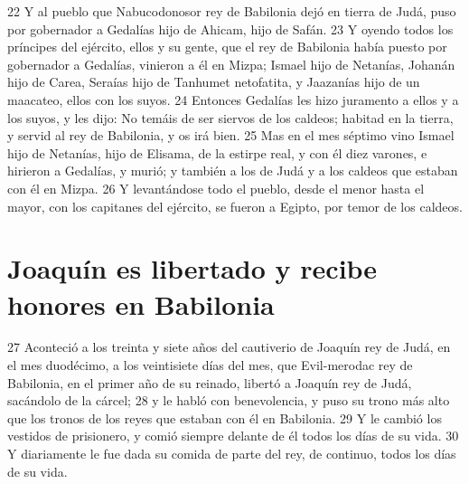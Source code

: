 22 Y al pueblo que Nabucodonosor rey de Babilonia dejó en tierra de Judá, puso por gobernador a Gedalías hijo de Ahicam, hijo de Safán.
23 Y oyendo todos los príncipes del ejército, ellos y su gente, que el rey de Babilonia había puesto por gobernador a Gedalías, vinieron a él en Mizpa; Ismael hijo de Netanías, Johanán hijo de Carea, Seraías hijo de Tanhumet netofatita, y Jaazanías hijo de un maacateo, ellos con los suyos.
24 Entonces Gedalías les hizo juramento a ellos y a los suyos, y les dijo: No temáis de ser siervos de los caldeos; habitad en la tierra, y servid al rey de Babilonia, y os irá bien. 
25 Mas en el mes séptimo vino Ismael hijo de Netanías, hijo de Elisama, de la estirpe real, y con él diez varones, e hirieron a Gedalías, y murió; y también a los de Judá y a los caldeos que estaban con él en Mizpa. 
26 Y levantándose todo el pueblo, desde el menor hasta el mayor, con los capitanes del ejército, se fueron a Egipto, por temor de los caldeos. 

\section*{Joaquín es libertado y recibe honores en Babilonia}

27 Aconteció a los treinta y siete años del cautiverio de Joaquín rey de Judá, en el mes duodécimo, a los veintisiete días del mes, que Evil-merodac rey de Babilonia, en el primer año de su reinado, libertó a Joaquín rey de Judá, sacándolo de la cárcel;
28 y le habló con benevolencia, y puso su trono más alto que los tronos de los reyes que estaban con él en Babilonia.
29 Y le cambió los vestidos de prisionero, y comió siempre delante de él todos los días de su vida.
30 Y diariamente le fue dada su comida de parte del rey, de continuo, todos los días de su vida.


